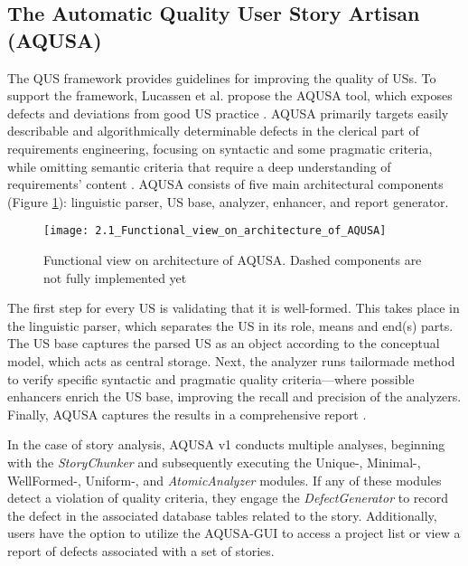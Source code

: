 \subsection*{The Automatic Quality User Story Artisan (AQUSA)} \label{aqusa}
The QUS framework provides guidelines for improving the quality of USs. To support the framework, Lucassen et al. propose the AQUSA tool, which exposes defects and deviations from good US practice \cite{lucassen2016improving}. AQUSA primarily targets easily describable and algorithmically determinable defects in the clerical part of requirements engineering, focusing on syntactic and some pragmatic criteria, while omitting semantic criteria that require a deep understanding of requirements' content \cite{lucassen2016improving}.
AQUSA consists of five main architectural components (Figure \ref{fig:aqusa}): linguistic parser, US base, analyzer, enhancer, and report generator.
\begin{figure}[h]
\center
\texttt{[image: 2.1\_Functional\_view\_on\_architecture\_of\_AQUSA]}
\caption{Functional view on architecture of AQUSA. Dashed components are not fully implemented yet \cite{lucassen2016improving}}\label{fig:aqusa}
\end{figure}

The first step for every US is validating that it is well-formed. This takes place in the linguistic parser, which separates the US in its role, means and end(s) parts. The US base captures the parsed US as an object according to the conceptual model, which acts as central storage.  Next, the analyzer runs tailormade method to verify specific syntactic and pragmatic quality criteria—where possible enhancers enrich the US base, improving the recall and precision of the analyzers. Finally, AQUSA captures the results in a comprehensive report \cite{lucassen2016improving}.

In the case of story analysis, AQUSA v1 conducts multiple analyses, beginning with the \emph{StoryChunker} and subsequently executing the Unique-, Minimal-, WellFormed-, Uniform-, and \emph{AtomicAnalyzer} modules. If any of these modules detect a violation of quality criteria, they engage the \emph{DefectGenerator} to record the defect in the associated database tables related to the story. Additionally, users have the option to utilize the AQUSA-GUI to access a project list or view a report of defects associated with a set of stories.
